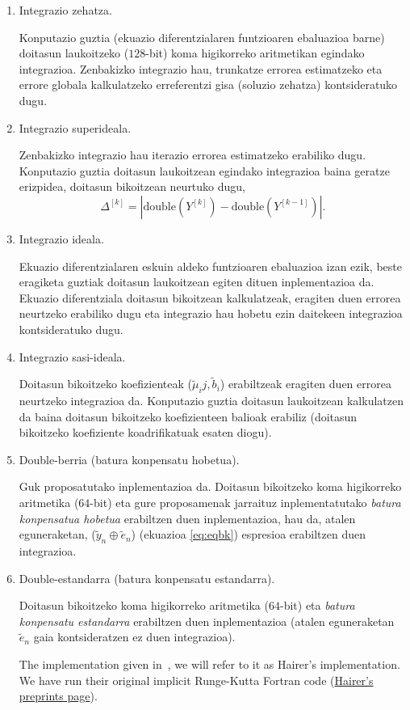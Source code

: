 \begin{enumerate}

\item Integrazio zehatza.

Konputazio guztia (ekuazio diferentzialaren funtzioaren ebaluazioa barne) doitasun laukoitzeko ($128$-bit) koma higikorreko aritmetikan  egindako integrazioa. Zenbakizko integrazio hau, trunkatze errorea estimatzeko eta errore globala kalkulatzeko erreferentzi gisa (soluzio zehatza) kontsideratuko dugu. 

\item Integrazio superideala.

Zenbakizko integrazio hau iterazio errorea estimatzeko erabiliko dugu. Konputazio guztia doitasun laukoitzean egindako integrazioa baina geratze erizpidea, doitasun bikoitzean neurtuko dugu,
\begin{equation*}
\Delta^{[k]}=|\text{double}(Y^{[k]})-\text{double}(Y^{[k-1]})|.
\end{equation*}

\item Integrazio ideala.

Ekuazio diferentzialaren eskuin aldeko funtzioaren ebaluazioa izan ezik, beste eragiketa guztiak doitasun laukoitzean egiten dituen inplementazioa da. Ekuazio diferentziala doitasun bikoitzean kalkulatzeak, eragiten duen errorea neurtzeko erabiliko dugu eta integrazio hau hobetu ezin daitekeen integrazioa kontsideratuko dugu.   

\item Integrazio sasi-ideala.

Doitasun bikoitzeko koefizienteak ($\tilde{\mu}_ij,\tilde{b}_i$) erabiltzeak eragiten duen errorea neurtzeko integrazioa da. Konputazio guztia doitasun laukoitzean kalkulatzen da baina doitasun bikoitzeko koefizienteen balioak erabiliz (doitasun bikoitzeko koefiziente koadrifikatuak esaten diogu).  
   
\item Double-berria (batura konpensatu hobetua).

Guk proposatutako inplementazioa da. Doitasun bikoitzeko  koma higikorreko aritmetika ($64$-bit) eta gure proposamenak jarraituz inplementatutako \emph{batura konpensatua hobetua} erabiltzen duen inplementazioa, hau da, atalen eguneraketan, ($\tilde{y}_n \oplus \tilde{e}_n$) (ekuazioa \ref{eq:eqbk}) espresioa erabiltzen duen integrazioa.

\item Double-estandarra (batura konpensatu estandarra).

Doitasun bikoitzeko koma higikorreko aritmetika ($64$-bit) eta \emph{batura konpensatu estandarra} erabiltzen duen inplementazioa (atalen eguneraketan $\tilde{e}_n$ gaia kontsideratzen ez duen integrazioa). 

The implementation given in~\cite{Hairer2008}, we will refer to it as Hairer's implementation. We have run their original implicit Runge-Kutta Fortran code  (\href{http://www.unige.ch/~hairer/preprints.html}{Hairer's preprints page}).

\end{enumerate}

